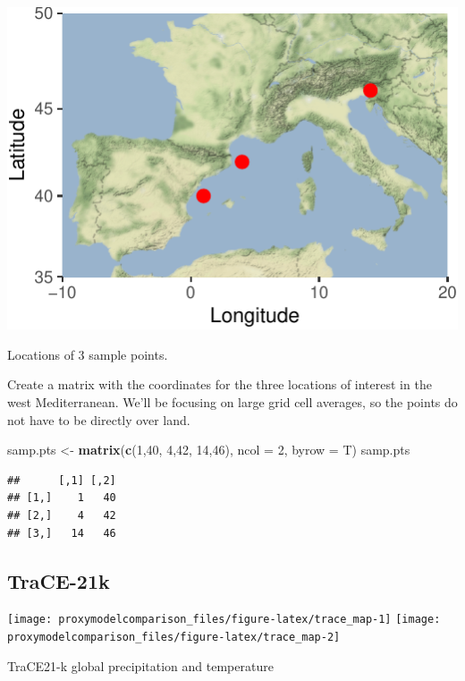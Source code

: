 \documentclass[11pt,]{tufte-handout}
\newenvironment{Shaded}{}{}
\newcommand{\KeywordTok}[1]{\textcolor[rgb]{0.00,0.44,0.13}{\textbf{{#1}}}}
\newcommand{\DataTypeTok}[1]{\textcolor[rgb]{0.56,0.13,0.00}{{#1}}}
\newcommand{\DecValTok}[1]{\textcolor[rgb]{0.25,0.63,0.44}{{#1}}}
\newcommand{\StringTok}[1]{\textcolor[rgb]{0.25,0.44,0.63}{{#1}}}
\newcommand{\NormalTok}[1]{{#1}}
\begin{document}
\begin{marginfigure}
\includegraphics{proxymodelcomparison_files/figure-latex/map-1} \caption[Locations of 3 sample points]{Locations of 3 sample points.}\label{fig:map}
\end{marginfigure}

Create a matrix with the coordinates for the three locations of interest
in the west Mediterranean. We'll be focusing on large grid cell
averages, so the points do not have to be directly over land.

\begin{Shaded}
\begin{Highlighting}[]
\NormalTok{samp.pts <-}\StringTok{ }\KeywordTok{matrix}\NormalTok{(}\KeywordTok{c}\NormalTok{(}\DecValTok{1}\NormalTok{,}\DecValTok{40}\NormalTok{, }\DecValTok{4}\NormalTok{,}\DecValTok{42}\NormalTok{, }\DecValTok{14}\NormalTok{,}\DecValTok{46}\NormalTok{), }\DataTypeTok{ncol =} \DecValTok{2}\NormalTok{, }\DataTypeTok{byrow =} \NormalTok{T)}
\NormalTok{samp.pts}
\end{Highlighting}
\end{Shaded}

\begin{verbatim}
##      [,1] [,2]
## [1,]    1   40
## [2,]    4   42
## [3,]   14   46
\end{verbatim}

\subsection{TraCE-21k}\label{trace-21k}

\begin{marginfigure}
\texttt{[image: proxymodelcomparison\_files/figure-latex/trace\_map-1]} \texttt{[image: proxymodelcomparison\_files/figure-latex/trace\_map-2]} \caption[TraCE21-k global precipitation and temperature]{TraCE21-k global precipitation and temperature}\label{fig:trace_map}
\end{marginfigure}
\end{document}
